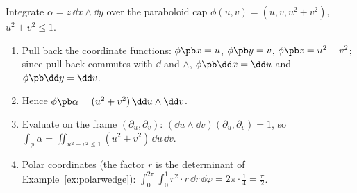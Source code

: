 \begin{example}\label{ex:paraboloid}
Integrate $\alpha=z\,\dd x\wedge\dd y$ over the paraboloid cap $\phi(u,v)=(u,v,u^2+v^2)$, $u^2+v^2\le1$.
\begin{enumerate}
\item Pull back the coordinate functions: $\phi\pb x=u$, $\phi\pb y=v$, $\phi\pb z=u^2+v^2$; since pull-back commutes with $\dd$ and $\wedge$, $\phi\pb\dd x=\dd u$ and $\phi\pb\dd y=\dd v$.
\item Hence $\phi\pb\alpha=(u^2+v^2)\,\dd u\wedge\dd v$.
\item Evaluate on the frame $(\partial_u,\partial_v)$: $(\dd u\wedge\dd v)(\partial_u,\partial_v)=1$, so $\int_\phi\alpha=\iint_{u^2+v^2\le1}(u^2+v^2)\,\dd u\,\dd v$.
\item Polar coordinates (the factor $r$ is the determinant of Example~\ref{ex:polarwedge}): $\displaystyle\int_0^{2\pi}\!\!\int_0^1r^2\cdot r\,\dd r\,\dd\varphi=2\pi\cdot\tfrac14=\tfrac\pi2$.
\end{enumerate}
\end{example}
